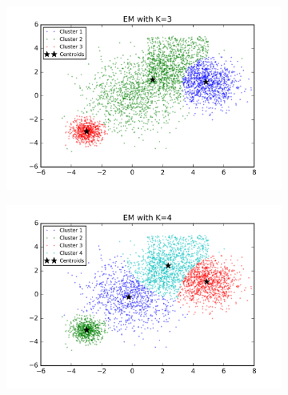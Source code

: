 \begin{description}
\begin{description}
\begin{figure}[!h]
        \centering
        \begin{subfigure}[b]{0.475\textwidth}
            \centering
            \includegraphics[width=\textwidth]{./figures/bigClustering_EM_3.png}
        \end{subfigure}
        \hfill
        \begin{subfigure}[b]{0.475\textwidth}  
            \centering 
            \includegraphics[width=\textwidth]{./figures/bigClustering_EM_4.png}
        \end{subfigure}
        \begin{subfigure}[b]{0.475\textwidth}  
            \centering 

\end{subfigure}
\end{figure}
\end{description}
\end{description}
